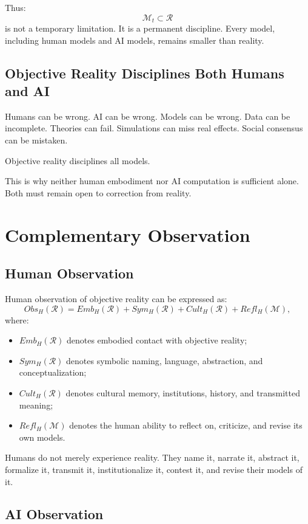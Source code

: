 \documentclass[11pt,a4paper]{article}
\begin{document}
Thus:
\[
\mathcal{M}_t\subset\mathcal{R}
\]
is not a temporary limitation. It is a permanent discipline. Every model, including human models and AI models, remains smaller than reality.

\subsection{Objective Reality Disciplines Both Humans and AI}

Humans can be wrong. AI can be wrong. Models can be wrong. Data can be incomplete. Theories can fail. Simulations can miss real effects. Social consensus can be mistaken.

Objective reality disciplines all models.

This is why neither human embodiment nor AI computation is sufficient alone. Both must remain open to correction from reality.

\section{Complementary Observation}

\subsection{Human Observation}

Human observation of objective reality can be expressed as:
\[
Obs_H(\mathcal{R})
=
Emb_H(\mathcal{R})
+
Sym_H(\mathcal{R})
+
Cult_H(\mathcal{R})
+
Refl_H(\mathcal{M}),
\]
where:
\begin{itemize}[leftmargin=2em]
\item $Emb_H(\mathcal{R})$ denotes embodied contact with objective reality;
\item $Sym_H(\mathcal{R})$ denotes symbolic naming, language, abstraction, and conceptualization;
\item $Cult_H(\mathcal{R})$ denotes cultural memory, institutions, history, and transmitted meaning;
\item $Refl_H(\mathcal{M})$ denotes the human ability to reflect on, criticize, and revise its own models.
\end{itemize}

Humans do not merely experience reality. They name it, narrate it, abstract it, formalize it, transmit it, institutionalize it, contest it, and revise their models of it.

\subsection{AI Observation}
\end{document}
